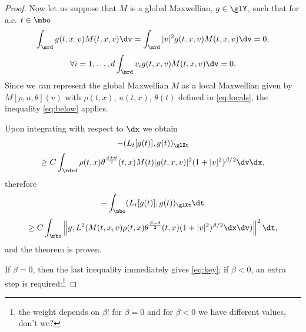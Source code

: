 \begin{proof}
Now let us suppose that $M$ is a global Maxwellian, $g\in \glY$, such that for a.e. $t\in \mbo$
\[\int_\mrd g(t,x,v) M(t,x,v)\dv =  \int_\mrd|v|^2 g(t,x,v) M(t,x,v)\dv=0,\]\[ \forall i=1,\dots , d \int _\mrd v_i  g(t,x,v) M(t,x,v)\dv=0.\]
Since we can represent the global Maxwellian $M$ as a local Maxwellian given by $  M [{\rho,u,\theta}](v)$ with $\rho(t,x)$, $u(t,x)$, $\theta(t)$ defined in \eqref{eq:locals}, the inequality \eqref{eq:below} applies. 

Upon integrating with respect to $\dx$ we obtain 
	\[-(L_t[g(t)],g(t))_{\glXt}\]\[\ge C \int_\rdrd \rho(t,x)\theta^{\frac{\beta+d}{2}}	(t,x)  M(t)|g(t,x,v)|^2 (1+|v|^2)^{\beta/2}\dv\dx,\]
therefore
\[-\int_{\mbo}(L_t[g(t)],g(t))_{\glXt}\dt\]\[\ge C \int_{\mbo}\left\|g,L^2(M(t,x,v)\rho(t,x)\theta^{\frac{\beta+d}{2}}	(t,x)(1+|v|^2)^{\beta/2}\dx\dv )\right\|^2\dt,\]and the theorem is proven.

If $\beta=0$, then the last inequality immediately gives \eqref{eq:key}; if $\beta<0$, an extra step is required:\footnote{the weight depends on $\beta$! for $\beta=0$ and for $\beta<0$ we have different values, don't we?}


\end{proof}


